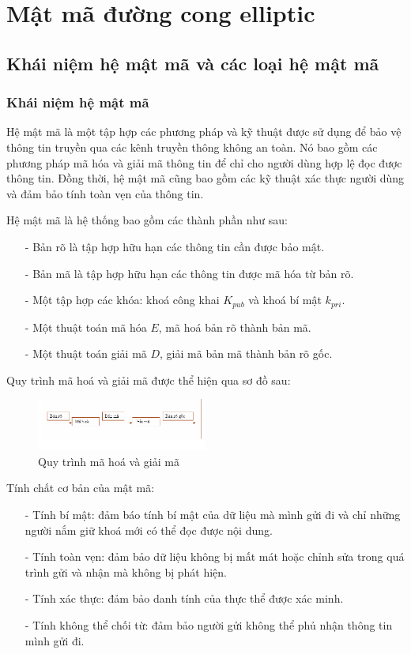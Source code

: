 \section{Mật mã đường cong elliptic}
\subsection{Khái niệm hệ mật mã và các loại hệ mật mã}

\subsubsection{Khái niệm hệ mật mã}
Hệ mật mã là một tập hợp các phương pháp và kỹ thuật được sử dụng để 
bảo vệ thông tin truyền qua các kênh truyền thông không an toàn. Nó 
bao gồm các phương pháp mã hóa và giải mã thông tin để chỉ cho người 
dùng hợp lệ đọc được thông tin. Đồng thời, hệ mật mã cũng bao gồm các 
kỹ thuật xác thực người dùng và đảm bảo tính toàn vẹn của thông tin.

Hệ mật mã là hệ thống bao gồm các thành phần như sau:
\begin{itemize}
    \item[-] Bản rõ là tập hợp hữu hạn các thông tin cần được bảo mật.
    \item[-] Bản mã là tập hợp hữu hạn các thông tin được mã hóa từ bản rõ.
    \item[-] Một tập hợp các khóa: khoá công khai $K_{pub}$ và khoá bí mật $k_{pri}$.
    \item[-] Một thuật toán mã hóa $E$, mã hoá bản rõ thành bản mã.
    \item[-] Một thuật toán giải mã $D$, giải mã bản mã thành bản rõ gốc.
\end{itemize}

Quy trình mã hoá và giải mã được thể hiện qua sơ đồ sau:
\begin{figure}[h]
    \centering
    \includegraphics[width=0.5\textwidth]{images/encrypt-decrypt.png}
    \caption{Quy trình mã hoá và giải mã}
    \label{fig:encrypt-decrypt}
\end{figure}

Tính chất cơ bản của mật mã:
\begin{itemize}
    \item[-] Tính bí mật: đảm báo tính bí mật của dữ liệu mà mình gửi đi và
        chỉ những người nắm giữ khoá mới có thể đọc được nội dung.
    \item[-] Tính toàn vẹn: đảm bảo dữ liệu không bị mất mát hoặc chỉnh sửa 
    trong quá trình gửi và nhận mà không bị phát hiện.
    \item[-] Tính xác thực: đảm bảo danh tính của thực thể được xác minh.
    \item[-] Tính không thể chối từ:  đảm bảo người gửi không thể phủ nhận
    thông tin mình gửi đi.
\end{itemize}


